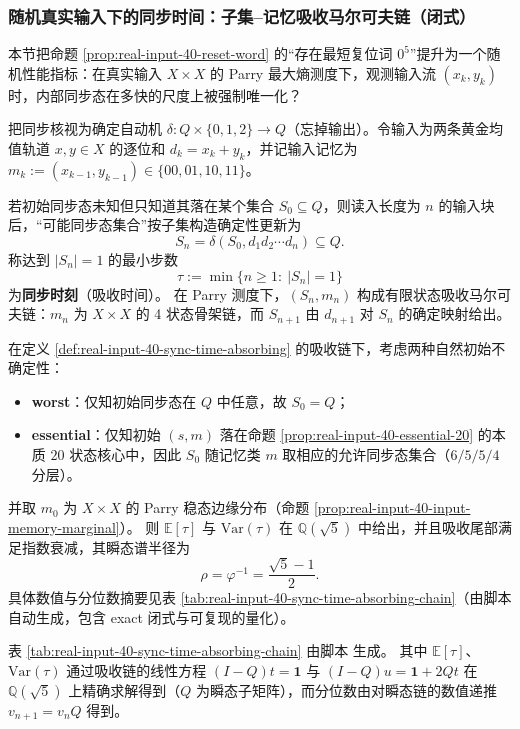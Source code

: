 \subsubsection{随机真实输入下的同步时间：子集--记忆吸收马尔可夫链（闭式）}\label{app:real-input-40-sync-time}
本节把命题 \ref{prop:real-input-40-reset-word} 的“存在最短复位词 $0^5$”提升为一个随机性能指标：在真实输入 $X\times X$ 的 Parry 最大熵测度下，观测输入流 $(x_k,y_k)$ 时，内部同步态在多快的尺度上被强制唯一化？

\begin{definition}[子集--记忆吸收链与同步时刻]\label{def:real-input-40-sync-time-absorbing}
把同步核视为确定自动机 \(\delta:Q\times\{0,1,2\}\to Q\)（忘掉输出）。令输入为两条黄金均值轨道 \(x,y\in X\) 的逐位和 \(d_k=x_k+y_k\)，并记输入记忆为 \(m_k:=(x_{k-1},y_{k-1})\in\{00,01,10,11\}\)。
\par
若初始同步态未知但只知道其落在某个集合 \(S_0\subseteq Q\)，则读入长度为 \(n\) 的输入块后，“可能同步态集合”按子集构造确定性更新为
\[
S_n=\delta(S_0,d_1d_2\cdots d_n)\subseteq Q.
\]
称达到 \(|S_n|=1\) 的最小步数
\[
\tau:=\min\{n\ge 1:\ |S_n|=1\}
\]
为\textbf{同步时刻}（吸收时间）。
在 Parry 测度下，\((S_n,m_n)\) 构成有限状态吸收马尔可夫链：\(m_n\) 为 \(X\times X\) 的 4 状态骨架链，而 \(S_{n+1}\) 由 \(d_{n+1}\) 对 \(S_n\) 的确定映射给出。
\end{definition}

\begin{proposition}\label{prop:real-input-40-sync-time-moments}
在定义 \ref{def:real-input-40-sync-time-absorbing} 的吸收链下，考虑两种自然初始不确定性：
\begin{itemize}
  \item \textbf{worst}：仅知初始同步态在 \(Q\) 中任意，故 \(S_0=Q\)；
  \item \textbf{essential}：仅知初始 $(s,m)$ 落在命题 \ref{prop:real-input-40-essential-20} 的本质 $20$ 状态核心中，因此 \(S_0\) 随记忆类 \(m\) 取相应的允许同步态集合（$6/5/5/4$ 分层）。
\end{itemize}
并取 \(m_0\) 为 \(X\times X\) 的 Parry 稳态边缘分布（命题 \ref{prop:real-input-40-input-memory-marginal}）。
则 \(\mathbb{E}[\tau]\) 与 \(\mathrm{Var}(\tau)\) 在 \(\mathbb{Q}(\sqrt5)\) 中给出，并且吸收尾部满足指数衰减，其瞬态谱半径为
\[
\rho=\varphi^{-1}=\frac{\sqrt5-1}{2}.
\]
具体数值与分位数摘要见表 \ref{tab:real-input-40-sync-time-absorbing-chain}（由脚本自动生成，包含 exact 闭式与可复现的量化）。
\end{proposition}



\begin{remark}[可复现输出与计算口径]\label{rem:real-input-40-sync-time-repro}
表 \ref{tab:real-input-40-sync-time-absorbing-chain} 由脚本  生成。
其中 \(\mathbb{E}[\tau]\)、\(\mathrm{Var}(\tau)\) 通过吸收链的线性方程
\(
(I-Q)t=\mathbf{1}
\)
与
\(
(I-Q)u=\mathbf{1}+2Qt
\)
在 \(\mathbb{Q}(\sqrt5)\) 上精确求解得到（\(Q\) 为瞬态子矩阵），而分位数由对瞬态链的数值递推 \(v_{n+1}=v_n Q\) 得到。
\end{remark}

